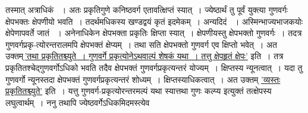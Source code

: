 \documentclass[11pt, openany]{book}
\begin{document}
\newpage

\begin{sloppypar}
\noindent तस्मात् अत्राधिकं ~। अतः प्रकृतिगुणे कनिष्ठवर्ग एतावत्क्षिप्तं स्यात्~। ज्येष्ठार्थं तु पूर्वं युक्त्या गुणवर्गः क्षेपभक्तः क्षेपणीयो भवति~। तदर्थमधिकस्य खण्डद्वयं कृतं \; इदमेकम्~। अन्यदिदं ~। अस्मिन्भाज्यभाजकयोः क्षेपेणापवर्ते जातं ~। अनेनाधिकेन क्षेपभक्ता प्रकृतिः क्षिप्ता स्यात्~। क्षेपणीयस्तु क्षेपभक्तो गुणवर्गः~। तदत्र गुणवर्गप्रकृ-त्योरन्तरालमपि क्षेपभक्तं क्षेप्यम्~। तथा सति क्षेपभक्तो गुणवर्ग एव क्षिप्तो भवेत्~। अत उक्तम्\textendash \,\hyperref[6.75]{'तथा प्रकृतितश्च्युते~। गुणवर्गे प्रकृत्योनेऽथवाल्पं शेषकं यथा~। तत्तु क्षेपहृतं क्षेपः'} इति~। तत्र प्रकृतितश्चेद्गुणवर्गोऽधिको भवति तदैव क्षेपभक्तं गुणवर्गप्रकृत्यन्तरं योज्यम्~। क्षिप्तस्य न्यूनत्वात्~। यदा तु गुणवर्गो न्यूनस्तदा क्षेपभक्तं गुणवर्गप्रकृत्यन्तरं शोध्यम्~। क्षिप्तस्याधिकत्वात्~। अत उक्तम् \hyperref[6.75]{'व्यस्तः प्रकृतितश्च्युते'} इति~। यत्तु गुणवर्ग-प्रकृत्योरन्तरमल्पं यथा स्यात्तथा गुणः कल्प्य इत्युक्तं तत्क्षेपस्य लघुत्वार्थम्~। ननु तथापि ज्येष्ठवर्गेऽधिकमिदमस्त्येव \;{\small $\begin{matrix}

\end{matrix}}
\end{sloppypar}
\end{document}
